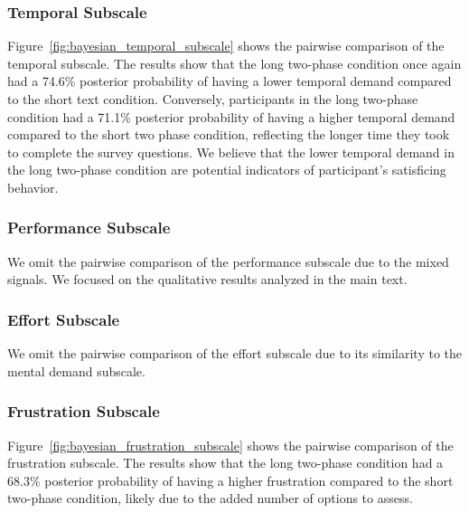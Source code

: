 \subsubsection{Temporal Subscale}
\label{sec:temporal_subscale_bayesian}
Figure~\ref{fig:bayesian_temporal_subscale} shows the pairwise comparison of the temporal subscale. The results show that the long two-phase condition once again had a 74.6\% posterior probability of having a lower temporal demand compared to the short text condition. Conversely, participants in the long two-phase condition had a 71.1\% posterior probability of having a higher temporal demand compared to the short two phase condition, reflecting the longer time they took to complete the survey questions. We believe that the lower temporal demand in the long two-phase condition are potential indicators of participant's satisficing behavior.

\subsubsection{Performance Subscale}
We omit the pairwise comparison of the performance subscale due to the mixed signals. We focused on the qualitative results analyzed in the main text.

\subsubsection{Effort Subscale}
We omit the pairwise comparison of the effort subscale due to its similarity to the mental demand subscale. 

\subsubsection{Frustration Subscale}
Figure~\ref{fig:bayesian_frustration_subscale} shows the pairwise comparison of the frustration subscale. The results show that the long two-phase condition had a 68.3\% posterior probability of having a higher frustration compared to the short two-phase condition, likely due to the added number of options to assess. 

